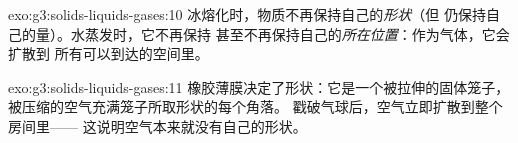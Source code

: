 \begin{solution}{exo:g3:solids-liquids-gases:10}
冰熔化时，物质不再保持自己的\emph{形状}（但
仍保持自己的量）。水蒸发时，它不再保持
甚至不再保持自己的\emph{所在位置}：作为气体，它会扩散到
所有可以到达的空间里。
\end{solution}

\begin{solution}{exo:g3:solids-liquids-gases:11}
橡胶薄膜决定了形状：它是一个被拉伸的固体笼子，
被压缩的空气充满笼子所取形状的每个角落。
戳破气球后，空气立即扩散到整个房间里——
这说明空气本来就没有自己的形状。
\end{solution}
